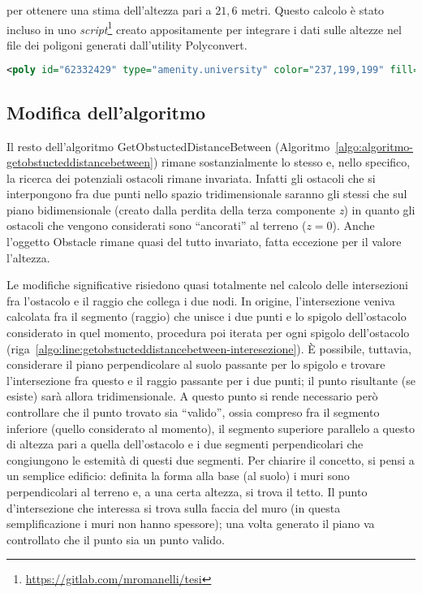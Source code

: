 per ottenere una stima dell'altezza pari a $21,6$ metri.
Questo calcolo è stato incluso in uno \textit{script}\footnote{\url{https://gitlab.com/mromanelli/tesi}} creato appositamente per integrare i dati sulle altezze nel file
dei poligoni generati dall'utility Polyconvert.
%
\begin{lstlisting}[language=XML,style=mystyle,numbers=none,linewidth=\textwidth,label={lst:esempio-poly-blocco-torre},caption={Forma di un edificio estratta da OSM e convertita con Polyconvert con l'aggiunta dell'altezza.}]
<poly id="62332429" type="amenity.university" color="237,199,199" fill="1" layer="-1.00" height="21.6" shape="79.68,73.38 119.66,61.39 108.52,24.49 88.84,30.39 68.53,36.48 79.68,73.38" />
\end{lstlisting}
%
%
\subsection{Modifica dell'algoritmo}\label{subsec:modifica-all-algoritmo}
Il resto dell'algoritmo \textsf{GetObstuctedDistanceBetween} (Algoritmo~\ref{algo:algoritmo-getobstucteddistancebetween})
rimane sostanzialmente lo stesso e, nello specifico, la ricerca dei potenziali ostacoli rimane invariata.
Infatti gli ostacoli che si interpongono fra due punti nello spazio tridimensionale saranno gli stessi che sul piano bidimensionale
(creato dalla perdita della terza componente \textit{z}) in quanto gli ostacoli che vengono considerati sono ``ancorati'' al terreno ($z=0$).
Anche l'oggetto \textsf{Obstacle} rimane quasi del tutto invariato, fatta eccezione per il valore l'altezza.

Le modifiche significative risiedono quasi totalmente nel calcolo delle intersezioni fra l'ostacolo e il raggio che collega i due nodi.
In origine, l'intersezione veniva calcolata fra il segmento (raggio) che unisce i due punti e lo spigolo dell'ostacolo considerato in quel
momento, procedura poi iterata per ogni spigolo dell'ostacolo (riga~\ref{algo:line:getobstucteddistancebetween-interesezione}).
È possibile, tuttavia, considerare il piano perpendicolare al suolo passante per lo spigolo e trovare l'intersezione fra questo
e il raggio passante per i due punti; il punto risultante (se esiste) sarà allora tridimensionale.
A questo punto si rende necessario però controllare che il punto trovato sia ``valido'', ossia compreso fra il segmento inferiore
(quello considerato al momento), il segmento superiore parallelo a questo di altezza pari a quella dell'ostacolo e i due segmenti
perpendicolari che congiungono le estemità di questi due segmenti.
Per chiarire il concetto, si pensi a un semplice edificio: definita la forma alla base (al suolo) i muri sono perpendicolari
al terreno e, a una certa altezza, si trova il tetto.
Il punto d'intersezione che interessa si trova sulla faccia del muro (in questa semplificazione i muri non hanno spessore);
una volta generato il piano va controllato che il punto sia un punto valido.

